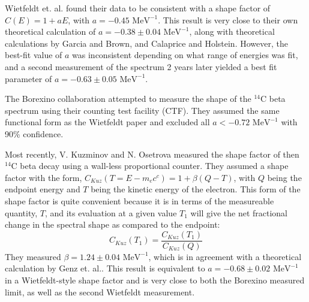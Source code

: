 Wietfeldt et. al. found their data to be consistent with a shape factor of $C(E)=1+aE$, with $a=-0.45 \text{ \ MeV}^{-1}$\cite{C14_Wietfeldt}. This result is very close to their own theoretical calculation of $a=-0.38 \pm 0.04 \text{ \ MeV}^{-1}$, along with theoretical calculations by Garcia and Brown\cite{C14_Garcia}, and  Calaprice and Holstein\cite{beta_Calaprice}. However, the best-fit value of $a$ was inconsistent depending on what range of energies was fit, and a second measurement of the spectrum 2 years later yielded a best fit parameter of $a=-0.63 \pm 0.05 \text{ \ MeV}^{-1}$. 

The Borexino collaboration attempted to measure the shape of the $^{14}$C beta spectrum using their counting test facility (CTF). They assumed the same functional form as the Wietfeldt paper and excluded all $a<-0.72 \text{ \ MeV}^{-1}$ with 90\% confidence\cite{C14_Borexino}. 


Most recently, V. Kuzminov and N. Osetrova measured the shape factor of then $^{14}$C beta decay using a wall-less proportional counter\cite{C14_Kuzminov}. They assumed a shape factor with the form, $C_{Kuz}(T=E-m_ec^c)=1+\beta(Q-T)$, with $Q$ being the endpoint energy and $T$ being the kinetic energy of the electron. This form of the shape factor is quite convenient because it is in terms of the measureable quantity, $T$, and its evaluation at a given value $T_1$ will give the net fractional change in the spectral shape as compared to the endpoint:
\begin{equation}
C_{Kuz}(T_1)=\frac{C_{Kuz}(T_1)}{C_{Kuz}(Q)}
\end{equation}
They measured $\beta=1.24 \pm0.04 \text{ \ MeV}^{-1}$, which is in agreement with a theoretical calculation by Genz et. al.\cite{C14_Genz}. This result is equivalent to $a=-0.68 \pm0.02 \text{ \ MeV}^{-1}$ in a Wietfeldt-style shape factor and is very close to both the Borexino measured limit, as well as the second Wietfeldt measurement.

